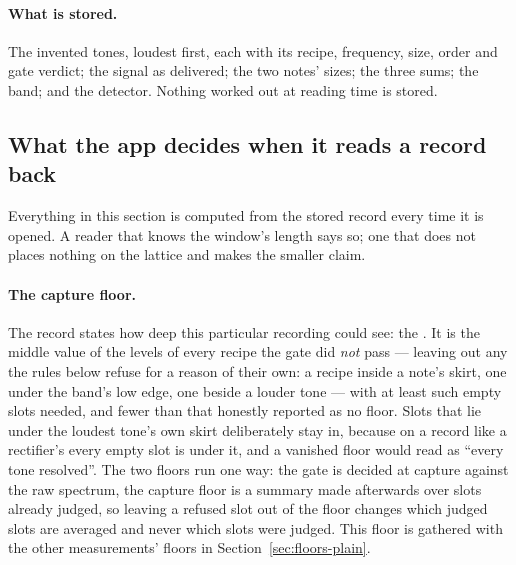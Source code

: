 \documentclass[11pt,a4paper]{article}
\begin{document}
\paragraph{What is stored.} The invented tones, loudest first, each with
its recipe, frequency, size, order and gate verdict; the signal as
delivered; the two notes' sizes; the three sums; the band; and the
detector. Nothing worked out at reading time is stored.

\subsection{What the app decides when it reads a record back}

Everything in this section is computed from the stored record every time
it is opened. A reader that knows the window's length says so; one that
does not places nothing on the lattice and makes the smaller claim.

\paragraph{The capture floor.} The record states how deep this
particular recording could see: the . It is the
middle value of the levels of every recipe the gate did \emph{not} pass
--- leaving out any the rules below refuse for a reason of their own: a
recipe inside a note's skirt, one under the band's low edge, one beside a
louder tone --- with at least \imdMinimumFloorSamples{} such empty slots
needed, and fewer than that honestly reported as no floor. Slots that lie
under the loudest tone's own skirt deliberately stay in, because on a
record like a rectifier's every empty slot is under it, and a vanished
floor would read as ``every tone resolved''. The two floors run one way:
the gate is decided at capture against the raw spectrum, the capture floor
is a summary made afterwards over slots already judged, so leaving a
refused slot out of the floor changes which judged slots are averaged and
never which slots were judged. This floor is gathered with the other
measurements' floors in Section~\ref{sec:floors-plain}.
\end{document}
